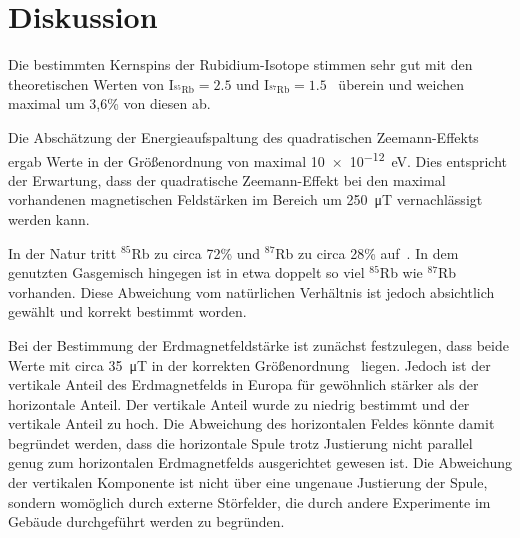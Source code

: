 \newpage
\section{Diskussion}
    Die bestimmten Kernspins der Rubidium-Isotope stimmen sehr gut mit den theoretischen Werten von $\text{I}_{\text{${}^{85}$Rb}} = \num{2.5}$ und 
    $\text{I}_{\text{${}^{87}$Rb}} = \num{1.5}$~\cite{millman_nuclear_1936} überein und weichen maximal um 3,6\% von diesen ab. \newline
    
    Die Abschätzung der Energieaufspaltung des quadratischen Zeemann-Effekts ergab Werte in der Größenordnung von maximal \SI{10e-12}{\electronvolt}. Dies entspricht 
    der Erwartung, dass der quadratische Zeemann-Effekt bei den maximal vorhandenen magnetischen Feldstärken im Bereich um \SI{250}{\micro\tesla} vernachlässigt werden kann. \newline
    
    In der Natur tritt ${}^{85}$Rb zu circa 72\% und ${}^{87}$Rb zu circa 28\% auf~\cite{noauthor_webelements_nodate}. In dem genutzten Gasgemisch hingegen ist in etwa doppelt so viel ${}^{85}$Rb wie ${}^{87}$Rb vorhanden. Diese Abweichung vom
    natürlichen Verhältnis ist jedoch absichtlich gewählt und korrekt bestimmt worden.\newline

    Bei der Bestimmung der Erdmagnetfeldstärke ist zunächst festzulegen, dass beide Werte mit circa \SI{35}{\micro\tesla} in der korrekten Größenordnung~\cite{noauthor_erdmagnetfeld_2021} liegen. Jedoch ist 
    der vertikale Anteil des Erdmagnetfelds in Europa für gewöhnlich stärker als der horizontale Anteil. Der vertikale Anteil wurde zu niedrig bestimmt und der vertikale Anteil zu hoch. 
    Die Abweichung des horizontalen Feldes könnte damit begründet werden, dass die horizontale Spule trotz Justierung nicht parallel genug zum horizontalen Erdmagnetfelds ausgerichtet gewesen ist. 
    Die Abweichung der vertikalen Komponente ist nicht über eine ungenaue Justierung der Spule, sondern womöglich durch externe Störfelder, die durch andere Experimente im Gebäude durchgeführt werden 
    zu begründen.    
